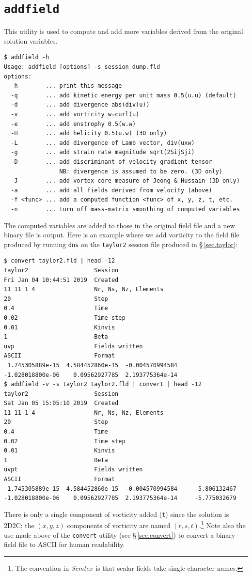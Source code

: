 \documentclass[11pt]{report}
\newcommand{\Semtex}{\emph{Semtex}} \newcommand{\Dog}{\emph{Dog}}
\begin{document}
\section{\texttt{addfield}}
\label{sec.addfield}

This utility is used to compute and add more variables derived from
the original solution variables.
{\small
\begin{verbatim}
$ addfield -h
Usage: addfield [options] -s session dump.fld
options:
  -h        ... print this message
  -q        ... add kinetic energy per unit mass 0.5(u.u) (default)
  -d        ... add divergence abs(div(u))
  -v        ... add vorticity w=curl(u)
  -e        ... add enstrophy 0.5(w.w)
  -H        ... add helicity 0.5(u.w) (3D only)
  -L        ... add divergence of Lamb vector, div(uxw)
  -g        ... add strain rate magnitude sqrt(2SijSji)
  -D        ... add discriminant of velocity gradient tensor
                NB: divergence is assumed to be zero. (3D only)
  -J        ... add vortex core measure of Jeong & Hussain (3D only)
  -a        ... add all fields derived from velocity (above)
  -f <func> ... add a computed function <func> of x, y, z, t, etc.
  -n        ... turn off mass-matrix smoothing of computed variables
\end{verbatim}
}
%
The computed variables are added to those in the original field file
and a new binary file is output.  Here is an example where we add
vorticity to the field file produced by running \verb|dns| on the
\verb|taylor2| session file produced in \S\,\ref{sec.taylor}:
{\small
\begin{verbatim}
$ convert taylor2.fld | head -12
taylor2                   Session
Fri Jan 04 10:44:51 2019  Created
11 11 1 4                 Nr, Ns, Nz, Elements
20                        Step
0.4                       Time
0.02                      Time step
0.01                      Kinvis
1                         Beta
uvp                       Fields written
ASCII                     Format
 1.745305889e-15  4.584452860e-15  -0.004570994584
-1.028018800e-06    0.09562927785  2.193775364e-14
$ addfield -v -s taylor2 taylor2.fld | convert | head -12
taylor2                   Session
Sat Jan 05 15:05:10 2019  Created
11 11 1 4                 Nr, Ns, Nz, Elements
20                        Step
0.4                       Time
0.02                      Time step
0.01                      Kinvis
1                         Beta
uvpt                      Fields written
ASCII                     Format
 1.745305889e-15  4.584452860e-15  -0.004570994584     -5.806132467
-1.028018800e-06    0.09562927785  2.193775364e-14     -5.775032679
\end{verbatim}
}
\noindent
There is only a single component of vorticity added (\verb|t|) since
the solution is 2D2C; the $(x,y,z)$ components of vorticity are named
$(r,s,t)$.\footnote{The convention in \Semtex\ is that scalar fields
  take single-character names.} Note also the use made above of the
\verb|convert| utility (see \S\,\ref{sec.convert}) to convert a binary
field file to ASCII for human readability.
\end{document}
